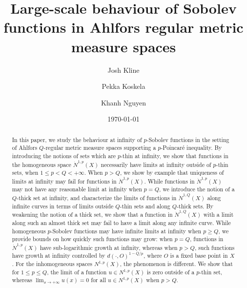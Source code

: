 \documentclass[10pt]{amsart}
\title[Large-scale behaviour of Sobolev functions]{Large-scale behaviour of Sobolev functions in Ahlfors regular metric measure spaces}
\author{Josh Kline}
\author{Pekka Koskela}
\author{Khanh Nguyen}
\date{\today}
\numberwithin{equation}{section}
\begin{document}
\maketitle
\begin{abstract}
In this paper, we study the behaviour at infinity of $p$-Sobolev functions in the setting of Ahlfors $Q$-regular metric measure spaces supporting a $p$-Poincar\'e inequality.  By introducing the notions of sets which are $p$-thin at infinity, we show that functions in the homogeneous space $\dot N^{1,p}(X)$ necessarily have limits at infinity outside of $p$-thin sets, when $1\le p<Q<+\infty$.  When $p>Q$, we show by example that uniqueness of limits at infinity may fail for functions in $\dot N^{1,p}(X)$. While functions in $\dot N^{1,p}(X)$ may not have any reasonable limit at infinity when $p=Q$, we introduce the notion of a $Q$-thick set at infinity, and characterize the limits of functions in $\dot N^{1,Q}(X)$ along infinite curves in terms of limits outside $Q$-thin sets and along $Q$-thick sets.  By weakening the notion of a thick set, we show that a function in $\dot N^{1,Q}(X)$ with a limit along such an almost thick set may fail to have a limit along any infinite curve.  While homogeneous $p$-Sobolev functions may have infinite limits at infinity when $p\ge Q$, we provide bounds on how quickly such functions may grow: when $p=Q$, functions in $\dot N^{1,p}(X)$ have sub-logarithmic growth at infinity, whereas when $p>Q$, such functions have growth at infinity controlled by $d(\cdot, O)^{1-Q/p}$, where $O$ is a fixed base point in $X$.  For the inhomogeneous spaces $N^{1,p}(X)$, the phenomenon is different.  We show that for $1\le p\le Q$, the limit of a function $u\in N^{1,p}(X)$ is zero outside of a $p$-thin set, whereas $\lim_{x\to+\infty}u(x)=0$ for all $u\in N^{1,p}(X)$ when $p>Q$. 



\end{abstract}
\end{document}
